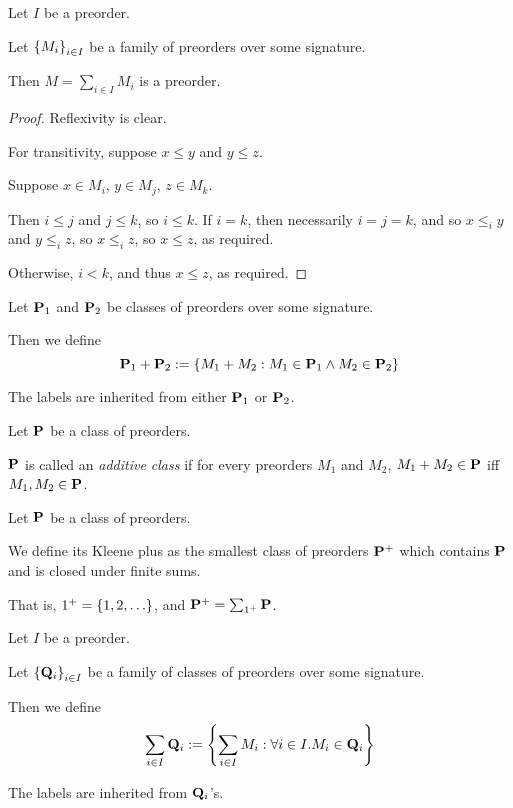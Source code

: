\begin{lemma}
  Let $I$ be a preorder.
  
  Let $\left\{ {M_i} \right\}_{i \in I}$ be a family of preorders
  over some signature.

  Then $M = \sum_{i \in I} M_i$ is a preorder.
\end{lemma}

\begin{proof}
  Reflexivity is clear.

  For transitivity, suppose $x \le y$ and $y \le z$.

  Suppose $x \in M_i$, $y \in M_j$, $z \in M_k$.

  Then $i \le j$ and $j \le k$, so $i \le k$.
  If $i = k$, then necessarily $i = j = k$, and so $x \le_i y$ and $y \le_i z$,
  so $x \le_i z$, so $x \le z$, as required.

  Otherwise, $i < k$, and thus $x \le z$, as required.
\end{proof}

\begin{definition}
  Let $\mathbf{P}_1$ and $\mathbf{P}_2$ be classes of preorders over some signature.

  Then we define
  \[
    \mathbf{P}_1 + \mathbf{P}_2 := \left\{ {M_1 + M_2 : M_1 \in \mathbf{P}_1 \wedge M_2 \in \mathbf{P}_2} \right\}
  \]

  The labels are inherited from either $\mathbf{P}_1$ or $\mathbf{P}_2$.
\end{definition}

\begin{definition}
  Let $\mathbf{P}$ be a class of preorders.

  $\mathbf{P}$ is called an \emph{additive class} if for every preorders $M_1$ and $M_2$,
  $M_1 + M_2 \in \mathbf{P}$ iff $M_1, M_2 \in \mathbf{P}$.
\end{definition}

\begin{definition}
  Let $\mathbf{P}$ be a class of preorders.

  We define its Kleene plus as the smallest class of preorders $\mathbf{P}^+$ which contains $\mathbf{P}$ and is closed under
  finite sums.

  That is, $1^+ = \left\{ {1, 2, \ldots} \right\}$, and $\mathbf{P}^+ = \sum_{1^+}{\mathbf{P}}$.
\end{definition}

\begin{definition}
  Let $I$ be a preorder.

  Let $\left\{ {\mathbf{Q}_i} \right\}_{i \in I}$ be a family of classes of preorders
  over some signature.

  Then we define
  \[
    \sum_{i \in I}{\mathbf{Q}_i} := \left\{ {\sum_{i \in I}{M_i} : \forall i \in I. M_i \in \mathbf{Q}_i} \right\}
  \]

  The labels are inherited from $\mathbf{Q}_i$'s.
\end{definition}

